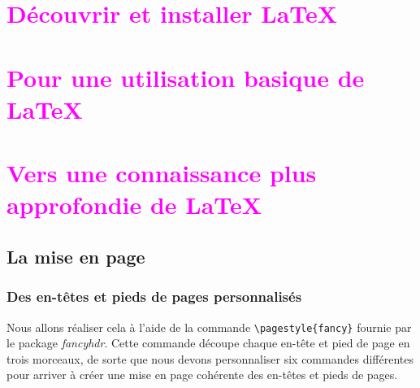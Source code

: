 \documentclass[a4paper,11pt]{book}
\title{\fbox{\LaTeX{} de A à X}}
\author{krystof}
\date{\today}
\begin{document}
\maketitle
\renewcommand{\contentsname}{Sommaire}
\tableofcontents


\part{\textcolor{magenta}{Découvrir et installer \LaTeX}}

\pagestyle{fancy}
\renewcommand{\headrulewidth}{1pt}
\renewcommand{\headsep}{15pt}
\setlength{\headheight}{1cm}
\lhead{\textcolor{magenta}{Chapitre} \thechapter}
\rhead{\thepage}
\cfoot{}







\part{\textcolor{magenta}{Pour une utilisation basique de \LaTeX}}










\part{\textcolor{magenta}{Vers une connaissance plus approfondie de \LaTeX}}
\chapter{La mise en page}
\section{Des en-têtes et pieds de pages personnalisés}
Nous allons réaliser cela à l'aide de la commande \verb|\pagestyle{fancy}| fournie par le package \textit{fancyhdr}. Cette commande découpe chaque en-tête et pied de page en trois morceaux, de sorte que nous devons personnaliser six commandes différentes pour arriver à créer une mise en page cohérente des en-têtes et pieds de pages.
\medskip
\end{document}

